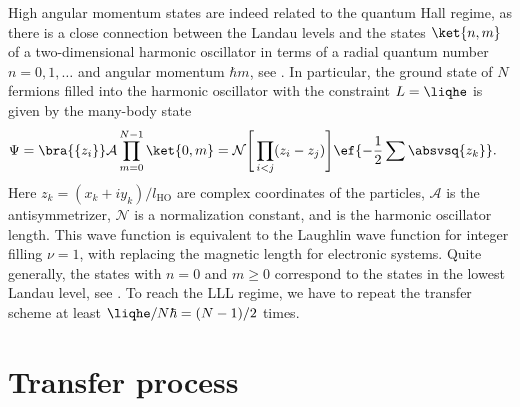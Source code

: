 High angular momentum states are indeed related to the quantum Hall regime, as there is a close connection between the Landau levels and the states $\ket{n,m}$ of a two-dimensional harmonic oscillator in terms of a radial quantum number $n=0,1,\dots$ and angular momentum $\hbar m$, see . In particular, the ground state of $N$ fermions filled into the harmonic oscillator with the constraint $L=\liqhe$ is given by the many-body state
\begin{align*}
\Psi&= \bra{\{z_i\}}\mathcal{A} \prod_{m=0}^{N-1} \ket{0,m} = \mathcal{N}\Bigg[\prod_{i<j} (z_i-z_j) \Bigg] \ef{-\frac{1}{2}\sum\absvsq{z_k}}.
\end{align*}
Here $z_k=(x_k+i y_k)/l_\text{HO}$ are complex coordinates of the particles, $\mathcal{A}$ is the antisymmetrizer, $\mathcal{N}$ is a normalization constant, and  is the harmonic oscillator length. This wave function is equivalent to the Laughlin wave function for integer filling $\nu=1$, with    replacing the magnetic length  for electronic systems. Quite generally, the states with $n=0$ and $m\ge 0$ correspond to the states in the lowest Landau level, see .
To reach the LLL regime, we have to repeat the transfer scheme at least $\liqhe/N\hbar=(N-1)/2$ times.

\section{Transfer process}

